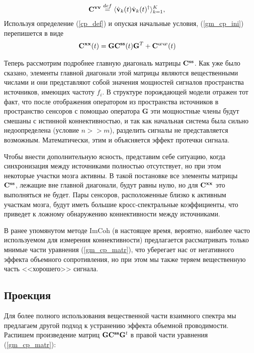 \begin{equation}
    \mathbf{C}^{\mathbf{v v}} \stackrel{def}{=} \langle{\hat{\mathbf{v}}_k(t) \hat{\mathbf{v}}_k(t)^{\dag}}\rangle_{k=1}^K, \\
    \label{cp_def}
\end{equation} 
Используя определение (\ref{cp_def}) и опуская начальные условия, (\ref{gm_cp_ini})
перепишется в виде
\begin{equation}
    \mathbf{C}^{\mathbf{x x}}(t) = \mathbf{G} \mathbf{C}^{\mathbf{s s}}(t) \mathbf{G}^T + \mathbf{C}^{\mathbf{\upomega \upomega}}(t)
    \label{gm_cp_matr}
\end{equation}

Теперь рассмотрим подробнее главную диагональ матрицы $\mathbf{C}^{\mathbf{s s}}$.
Как уже было сказано, элементы главной диагонали этой матрицы являются вещественными числами
и они представляют собой значения мощностей сигналов пространства источников,
имеющих частоту $f_i$. В структуре порождающей модели отражен тот факт,
что после отображения оператором из пространства источников в пространство сенсоров
с помощью оператора $\mathbf{G}$ эти мощностные члены будут смешаны с истинной коннективностью,
и так как начальная система была сильно недоопределена (условие $n >> m$),
разделить сигналы не представляется возможным.
Математически, этим и объясняется эффект протечки сигнала. 

Чтобы внести дополнительную ясность, представим себе ситуацию,
когда синхронизация между источниками полностью отсутствует,
но при этом некоторые участки мозга активны.
В такой постановке все элементы матрицы $\mathbf{C}^{\mathbf{s s}}$, лежащие вне главной диагонали,
будут равны нулю, но для $\mathbf{C}^{\mathbf{x x}}$ это выполняться не будет.
Пары сенсоров, расположенные близко к активным участкам мозга,
будут иметь большие кросс-спектральные коэффициенты,
что приведет к ложному обнаружению коннективности между источниками.

В ранее упомянутом методе ImCoh (в настоящее время, вероятно,
наиболее часто используемом для измерения коннективности)
предлагается рассматривать только мнимые части уравнения (\ref{gm_cp_matr}),
что уберегает нас от негативного эффекта объемного сопротивления,
но при этом мы также теряем вещественную часть <<хорошего>> сигнала.

\subsection{Проекция}

Для более полного использования вещественной части взаимного спектра мы предлагаем другой подход к устранению эффекта объемной проводимости. Распишем  произведение матриц $\mathbf{G} \mathbf{C}^{\mathbf{s s}} \mathbf{G}^t$ в правой части уравнения (\ref{gm_cp_matr}):

